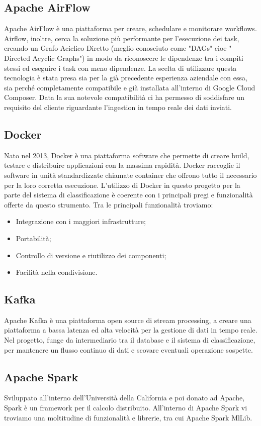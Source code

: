 \subsection{Apache AirFlow}
Apache AirFlow \cite{ApacheAirFlow} è una piattaforma per creare, schedulare e monitorare \gls{workflows}. Airflow, inoltre, cerca la soluzione più performante per l'esecuzione dei task, creando un Grafo Aciclico Diretto (meglio conosciuto come "\gls{DAGs}" cioe " Directed Acyclic Graphs") in modo da riconoscere le dipendenze tra i compiti stessi ed eseguire i task con meno dipendenze.
La scelta di utilizzare questa tecnologia è stata presa sia per la già precedente esperienza aziendale con essa, sia perché completamente compatibile e già installata all'interno di Google Cloud Composer. Data la sua notevole compatibilità ci ha permesso di soddisfare un requisito del cliente riguardante l'ingestion in tempo reale dei dati inviati.
\subsection{Docker}
Nato nel 2013, Docker è una piattaforma software che permette di creare build, testare e distribuire applicazioni con la massima rapidità. Docker raccoglie il software in unità standardizzate chiamate container che offrono tutto il necessario per la loro corretta esecuzione. L'utilizzo di Docker in questo progetto per la parte del sistema di classificazione è coerente con i principali pregi e funzionalità offerte da questo strumento.
Tra le principali funzionalità troviamo:
\begin{itemize}
	\item Integrazione con i maggiori infrastrutture;
	\item Portabilità;
	\item Controllo di versione e riutilizzo dei componenti;
	\item Facilità nella condivisione.
\end{itemize}
\subsection{Kafka}
Apache Kafka è una piattaforma open source di stream processing, a creare una piattaforma a bassa latenza ed alta velocità per la gestione di dati in tempo reale.
Nel progetto, funge da intermediario tra il database e il sistema di classificazione, per mantenere un flusso continuo di dati e scovare eventuali operazione sospette.
\subsection{Apache Spark}
Sviluppato all'interno dell'Università della California e poi donato ad Apache, Spark è un framework per il calcolo distribuito. 
All'interno di Apache Spark vi troviamo una moltitudine di funzionalità e librerie, tra cui Apache Spark MlLib.
